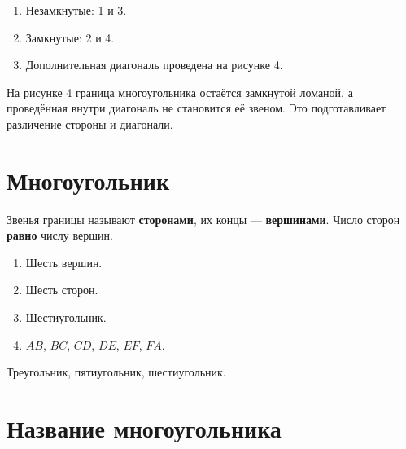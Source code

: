 \studentrecognizefigure

\begin{practicebox}
  \begin{enumerate}[label=\alph*),itemsep=0.45em]
    \item Незамкнутые: 1 и 3.
    \item Замкнутые: 2 и 4.
    \item Дополнительная диагональ проведена на рисунке 4.
  \end{enumerate}
\end{practicebox}

\begin{teacherbox}
  На рисунке 4 граница многоугольника остаётся замкнутой ломаной, а
  проведённая внутри диагональ не становится её звеном. Это подготавливает
  различение стороны и диагонали.
\end{teacherbox}

\section{Многоугольник}

\polygonpartsfigure

\begin{propertybox}[Ответ]
  Звенья границы называют \textbf{сторонами}, их концы ---
  \textbf{вершинами}. Число сторон \textbf{равно} числу вершин.
\end{propertybox}

\begin{practicebox}
  \begin{enumerate}[label=\alph*),itemsep=0.4em]
    \item Шесть вершин.
    \item Шесть сторон.
    \item Шестиугольник.
    \item \(AB\), \(BC\), \(CD\), \(DE\), \(EF\), \(FA\).
  \end{enumerate}
\end{practicebox}

\polygonnamesfigure

\begin{practicebox}
  Треугольник, пятиугольник, шестиугольник.
\end{practicebox}

\section{Название многоугольника}

